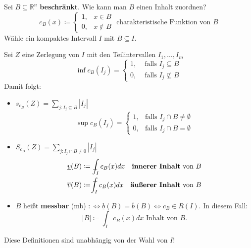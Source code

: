 \documentclass[12pt]{extreport} %
\newcommand{\R}{\mathbb{R}}
\theoremstyle{named}
\theoremstyle{nnamed}
\theoremstyle{itshape}
\theoremstyle{normal}
\begin{document}
Sei $B \subseteq \R^{n}$ \textbf{beschränkt}. Wie kann man $B$ einen Inhalt zuordnen?
$$ c_{B}(x) \coloneqq \begin{cases} 1, & x \in B \\ 0, & x \notin B \end{cases} \text{ charakteristische Funktion von } B $$
Wähle ein kompaktes Intervall $I$ mit $B \subseteq I$.

\bigskip

Sei $Z$ eine Zerlegung von $I$ mit den Teilintervallen $I_{1}, \dotsc, I_{m}$
$$ \inf c_{B}(I_{j}) = \begin{cases} 1, & \text{ falls } I_{j} \subseteq B \\ 0, & \text{ falls } I_{j} \not\subseteq B \end{cases} $$
Damit folgt:    
\begin{itemize} 
	\item $s_{c_{B}}(Z) = \sum_{j : I_{j} \subseteq B} |I_{j}|$
		$$ \sup c_{B}(I_{j}) = \begin{cases} 1, & \text{falls } I_{j} \cap B \neq \emptyset \\ 0, & \text{falls } I_{j} \cap B = \emptyset \end{cases} $$
	\item $S_{c_{B}}(Z) = \sum_{j: I_{j} \cap B \neq 0} |I_{j}|$
		\begin{align*}
			\underline{v}(B) & \coloneqq \lowdashint_{I} c_{B}(x) dx \quad \textbf{innerer Inhalt} \text{ von } B \\
			\overline{v}(B) & \coloneqq \highdashint_{I} c_{B}(x) dx \quad \textbf{äußerer Inhalt} \text{ von } B \\
		\end{align*}
	\item $B$ hei{\ss}t \textbf{messbar} (mb) $:\iff \underline{b}(B) = \overline{b}(B) \iff c_{B} \in R(I)$. In diesem Fall:
		$$ |B| \coloneqq \int_{I} c_{B}(x) dx \text{ Inhalt von } B. $$
\end{itemize}
Diese Definitionen sind unabhängig von der Wahl von $I$!
\end{document}
